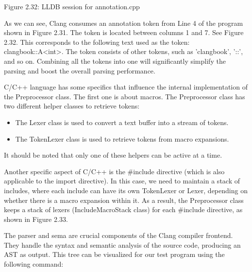 \begin{center}
Figure 2.32: LLDB session for annotation.cpp
\end{center}

As we can see, Clang consumes an annotation token from Line 4 of the program shown in Figure 2.31. The token is located between columns 1 and 7. See Figure 2.32. This corresponds to the following text used as the token: clangbook::A<int>. The token consists of other tokens, such as 'clangbook', '::', and so on. Combining all the tokens into one will significantly simplify the parsing and boost the overall parsing performance.


C/C++ language has some specifics that influence the internal implementation of the Preprocessor class. The first one is about macros. The Preprocessor class has two different helper classes to retrieve tokens:

\begin{itemize}
\item
The Lexer class is used to convert a text buffer into a stream of tokens.

\item
The TokenLexer class is used to retrieve tokens from macro expansions.
\end{itemize}

It should be noted that only one of these helpers can be active at a time.

Another specific aspect of C/C++ is the \#include directive (which is also applicable to the import directive). In this case, we need to maintain a stack of includes, where each include can have its own TokenLexer or Lexer, depending on whether there is a macro expansion within it. As a result, the Preprocessor class keeps a stack of lexers (IncludeMacroStack class) for each \#include directive, as shown in Figure 2.33.


The parser and sema are crucial components of the Clang compiler frontend. They handle the syntax and semantic analysis of the source code, producing an AST as output. This tree can be visualized for our test program using the following command:


